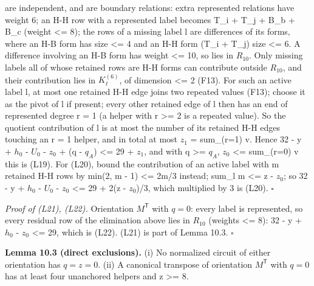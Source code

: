 are independent, and are boundary relations: extra represented relations have weight 6; an H-H row with a represented label becomes T\_i + T\_j + B\_b + B\_c (weight \textless= 8); the rows of a missing label l are differences of its forms, where an H-B form has size \textless= 4 and an H-H form (T\_i + T\_j) size \textless= 6. A difference involving an H-B form has weight \textless= 10, so lies in \(R_{10}\). Only missing labels all of whose retained rows are H-H forms can contribute outside \(R_{10}\), and their contribution lies in \(K^{(6)}_\ell\), of dimension \textless= 2 (F13). For such an active label l, at most one retained H-H edge joins two repeated values (F13); choose it as the pivot of l if present; every other retained edge of l then has an end of represented degree r = 1 (a helper with r \textgreater= 2 is a repeated value). So the quotient contribution of l is at most the number of its retained H-H edges touching an r = 1 helper, and in total at most \(z_1\) = sum\_(r=1) v. Hence 32 - y + \(h_0\) - \(U_0\) - \(z_0\) + (q - \(q_A\)) \textless= 29 + \(z_1\), and with q \textgreater= \(q_A\), \(z_0\) \textless= sum\_(r=0) v this is (L19). For (L20), bound the contribution of an active label with m retained H-H rows by min(2, m - 1) \textless= 2m/3 instead; sum\_l m \textless= z - \(z_0\); so 32 - y + \(h_0\) - \(U_0\) - \(z_0\) \textless= 29 + 2(z - \(z_0\))/3, which multiplied by 3 is (L20). \(\square\)

\emph{Proof of (L21), (L22).} Orientation \(M^{\mathsf T}\) with \(q=0\): every label is represented, so every residual row of the elimination above lies in \(R_{10}\) (weights \textless= 8): 32 - y + \(h_0\) - \(z_0\) \textless= 29, which is (L22). (L21) is part of Lemma 10.3. \(\square\)

\textbf{Lemma 10.3 (direct exclusions).} (i) No normalized circuit of either orientation has \(q=z=0\). (ii) A canonical transpose of orientation \(M^{\mathsf T}\) with \(q=0\) has at least four unanchored helpers and z \textgreater= 8.

